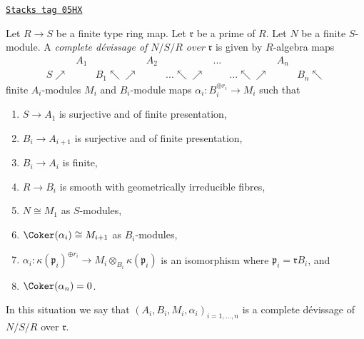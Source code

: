 \begin{definition}
\label{flat-definition-complete-devissage-algebra}
\href{https://stacks.math.columbia.edu/tag/05HX}{\texttt{Stacks tag 05HX}}

Let $R \to S$ be a finite type ring map.
Let $\mathfrak r$ be a prime of $R$.
Let $N$ be a finite $S$-module.
A {\it complete d\'evissage of $N/S/R$ over $\mathfrak r$}
is given by $R$-algebra maps
$$
\begin{array}{ccccccccc} & A_1 &  & A_2 &  & ... &  & A_n &  \\ S \nearrow &  & B_1 \nwarrow\nearrow &  & ... \nwarrow\nearrow &  & ... \nwarrow\nearrow &  & B_n \nwarrow\end{array}
$$
finite $A_i$-modules $M_i$ and $B_i$-module maps
$\alpha_i : B_i^{\oplus r_i} \to M_i$ such that
\begin{enumerate}
\item $S \to A_1$ is surjective and of finite presentation,
\item $B_i \to A_{i + 1}$ is surjective and of finite presentation,
\item $B_i \to A_i$ is finite,
\item $R \to B_i$ is smooth with geometrically irreducible fibres,
\item $N \cong M_1$ as $S$-modules,
\item $\Coker(\alpha_i) \cong M_{i + 1}$ as $B_i$-modules,
\item $\alpha_i : \kappa(\mathfrak p_i)^{\oplus r_i}
\to M_i \otimes_{B_i} \kappa(\mathfrak p_i)$ is an isomorphism
where $\mathfrak p_i = \mathfrak rB_i$, and
\item $\Coker(\alpha_n) = 0$.
\end{enumerate}
In this situation we say that
$(A_i, B_i, M_i, \alpha_i)_{i = 1, \ldots, n}$
is a complete d\'evissage of $N/S/R$ over $\mathfrak r$.
\end{definition}

